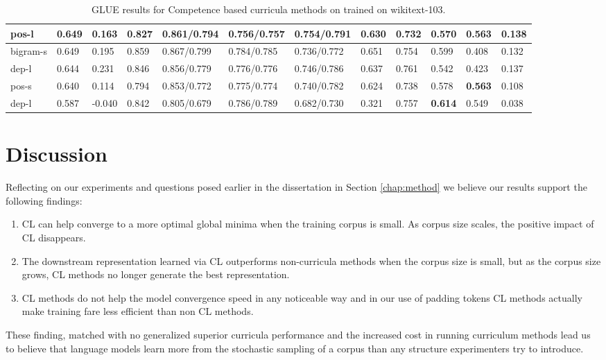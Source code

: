 \begin{table}[]
{\begin{tabular}{|l|l|l|l|l|l|l|l|l|l|l|l|}
pos-l & 0.649 & 0.163 & 0.827 & 0.861/0.794 & 0.756/0.757 & \textbf{0.754}/0.791 & 0.630 & 0.732 & 0.570 & \textbf{0.563} & 0.138 \\ \hline
bigram-s & 0.649 & 0.195 & 0.859 & 0.867/0.799 & 0.784/0.785 & 0.736/0.772 & 0.651 & 0.754 & 0.599 & 0.408 & 0.132 \\\hline
dep-l & 0.644 & 0.231 & 0.846 & 0.856/0.779 & 0.776/0.776 & 0.746/0.786 & 0.637 & 0.761 & 0.542 & 0.423 & 0.137 \\ \hline
pos-s & 0.640 & 0.114 & 0.794 & 0.853/0.772 & 0.775/0.774 & 0.740/0.782 & 0.624 & 0.738 & 0.578 & \textbf{0.563} & 0.108 \\ \hline
dep-l & 0.587 & -0.040 & 0.842 & 0.805/0.679 & 0.786/0.789 & 0.682/0.730 & 0.321 & 0.757 & \textbf{0.614} & 0.549 & 0.038 \\ \hline
\end{tabular}%
}
\caption{GLUE results for Competence based curricula methods on trained on wikitext-103.}
\label{tab:glue-wiki-103}
\end{table}
\section{Discussion}
Reflecting on our experiments and questions posed earlier in the dissertation in Section \ref{chap:method} we believe our results support the following findings:
\begin{enumerate}
\item CL can help converge to a more optimal global minima when the training corpus is small. As corpus size scales, the positive impact of CL disappears.
\item The downstream representation learned via CL outperforms non-curricula methods when the corpus size is small, but as the corpus size grows, CL methods no longer generate the best representation.
\item CL methods do not help the model convergence speed in any noticeable way and in our use of padding tokens CL methods actually make training fare less efficient than non CL methods.
\end{enumerate}
These finding, matched with no generalized superior curricula performance and the increased cost in running curriculum methods lead us to believe that language models learn more from the stochastic sampling of a corpus than any structure experimenters try to introduce. 
